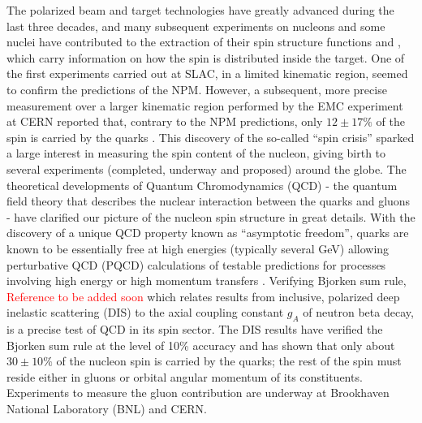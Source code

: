 The polarized beam and target technologies have greatly advanced during the last three decades, and %
many subsequent experiments on nucleons and some nuclei have contributed to the extraction of their spin structure functions \gone and \gtwo, which carry information on how the spin is distributed inside the target. %
One of the first experiments carried out at SLAC, in a limited kinematic region, seemed to confirm the predictions of the NPM. However, a subsequent, more precise measurement over a %
larger kinematic region performed by the EMC experiment at CERN reported that, contrary to the NPM predictions, only $12\pm 17\%$ %
of the spin is carried by the quarks \cite{Ashman1988364, Piguet:1989va}. This discovery of the so-called ``spin crisis'' %
 sparked a large interest in measuring the spin content of the nucleon, giving birth to several experiments (completed, underway and proposed) around the globe. The %
 theoretical developments of Quantum Chromodynamics (QCD) - the quantum field theory that describes the nuclear interaction between the quarks and gluons - have clarified our picture of the nucleon spin structure in great details. With the discovery of a unique QCD property known as ``asymptotic freedom'', quarks are %
 known to be essentially free %
at high energies (typically several GeV)
allowing perturbative QCD (PQCD) calculations of testable predictions for processes involving high energy or high momentum transfers \cite{wikiCoupling}.  
Verifying Bjorken sum rule, %
\textcolor{red}{Reference to be added soon}
which relates results from %
 inclusive, polarized deep inelastic scattering (DIS) %
to the %
axial coupling constant $g_A$ of neutron beta decay, is a precise %
 test of QCD in its spin sector. %
The DIS results have verified the Bjorken sum rule at the level of 10\% accuracy and has shown that only about $30 \pm 10\%$ of the nucleon spin is carried by the quarks; the rest of the spin must reside either in gluons or orbital angular momentum of its constituents. Experiments to measure the gluon contribution are underway at %
Brookhaven National Laboratory (BNL) and CERN. %

